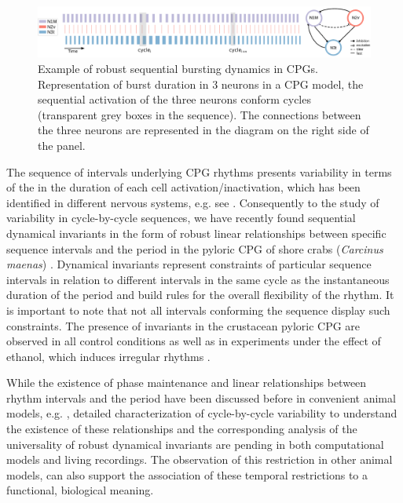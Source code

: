 \begin{figure}[htb!]
	\includegraphics[width=\textwidth]{img/invariants/variability/sequences_in_cpgs.png}
	\caption{Example of robust sequential bursting dynamics in CPGs. Representation of burst duration in 3 neurons in a CPG model, the sequential activation of the three neurons conform cycles (transparent grey boxes in the sequence). The connections between the three neurons are represented in the diagram on the right side of the panel.}
	\label{fig:sequences_in_cpgs}
\end{figure}

The sequence of intervals underlying CPG rhythms presents variability in terms of the in the duration of each cell activation/inactivation, which has been identified in different nervous systems, e.g. see \cite{reyes_artificial_2008,elliott_temporal_1991,martinez_shortterm_2019}. Consequently to the study of variability in cycle-by-cycle sequences, we have recently found sequential dynamical invariants in the form of robust linear relationships between specific sequence intervals and the period in the pyloric CPG of shore crabs (\textit{Carcinus maenas}) \parencite{elices_robust_2019}. Dynamical invariants represent constraints of particular sequence intervals in relation to different intervals in the same cycle as the instantaneous duration of the period and build rules for the overall flexibility of the rhythm. It is important to note that not all intervals conforming the sequence display such constraints. The presence of invariants in the crustacean pyloric CPG are observed in all control conditions as well as in experiments under the effect of ethanol, which induces irregular rhythms \parencite{elices_robust_2019}. 



While the existence of phase maintenance and linear relationships between rhythm intervals and the period have been discussed before in convenient animal models, e.g. \cite{grillner_generation_1976,hooper_phase_1997,vavoulis_dynamic_2007}, detailed characterization of cycle-by-cycle variability to understand the existence of these relationships and the corresponding analysis of the universality of robust dynamical invariants are pending in both computational models and living recordings. The observation of this restriction in other animal models, can also support the association of these temporal restrictions to a functional, biological meaning.

